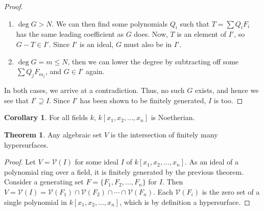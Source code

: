 \documentclass{book}
\newcommand{\V}[1]{\mathcal{V}(#1)}
\newcommand{\kn}{k[x_1,x_2,\ldots,x_n]}
\theoremstyle{definition}
\newtheorem*{cor}{Corollary}
\newtheorem*{thmsmall}{Theorem}
\theoremstyle{block}
\theoremstyle{thm}
\begin{document}
\begin{proof}[Proof]
\begin{enumerate}[label=(\alph*)]
  \item $\deg G > N$. We can then find some polynomials $Q_i$ such that $T =
    \sum Q_iF_i$ has the same leading coefficient as $G$ does. Now, $T$ is an
    element of $I'$, so $G-T\in I'$. Since $I'$ is an ideal, $G$ must also be in
    $I'$.
  \item $\deg G = m\leq N$, then we can lower the degree by subtracting off some
    $\sum Q_jF_{m_j}$, and $G\in I'$ again.
\end{enumerate}
In both cases, we arrive at a contradiction. Thus, no such $G$ exists, and hence
we see that $I'\supseteq I$. Since $I'$ has been shown to be finitely generated,
$I$ is too. 
\end{proof}

\begin{cor}For all fields $k$, $\kn$ is Noetherian.\end{cor}
\begin{thmsmall}Any algebraic set $V$ is the intersection of finitely many
  hypersurfaces.\end{thmsmall}

\begin{proof}
  Let $V = \V I$ for some ideal $I$ of $\kn$. As an ideal of a polynomial ring over a field, it is finitely
  generated by the previous theorem. Consider a generating set
  $F=\{F_1,F_2,\ldots,F_n\}$ for $I$. Then $V = \V I = \V {F_1}\cap\V
    {F_2}\cap\cdots\cap\V{F_n}$. Each $\V{F_i}$ is the zero set of a single
  polynomial in $\kn$, which is by definition a hypersurface.
\end{proof}
\end{document}

